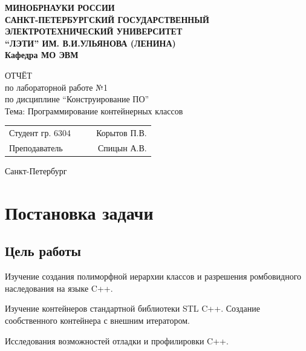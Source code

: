 \documentclass[a4paper, 14pt]{extarticle}
\begin{document}
    
\begin{titlepage}
    \centering
    {\bfseries
        \uppercase{%
            Минобрнауки России \\
            Санкт-Петербургский государственный \\
            Электротехнический университет \\
            \enquote{ЛЭТИ} им. В.И.Ульянова (Ленина)\\
        }
        Кафедра МО ЭВМ

        \vspace{\fill}
        \uppercase{Отчёт}\\
        по лабораторной работе №1\\
        по дисциплине \enquote{Конструирование ПО} \\
        Тема: Программирование контейнерных классов
    }

    \vspace{\fill}
    \begin{tabularx}{0.8\textwidth}{l X c r}
        Студент гр. 6304 & & \underline{\hspace{3cm}} & Корытов П.В.\\
        Преподаватель & & \underline{\hspace{3cm}} & Спицын А.В.
    \end{tabularx}

    \vspace{1cm}
    Санкт-Петербург \\
    \the\year{}
\end{titlepage}

\newpage
\tableofcontents{}

\newpage

\section{Постановка задачи}
\subsection{Цель работы}
Изучение создания полиморфной иерархии классов и разрешения ромбовидного наследования на языке C++.

Изучение контейнеров стандартной библиотеки STL C++. Создание сообственного контейнера с внешним итератором.

Исследования возможностей отладки и профилировки C++.
\end{document}
